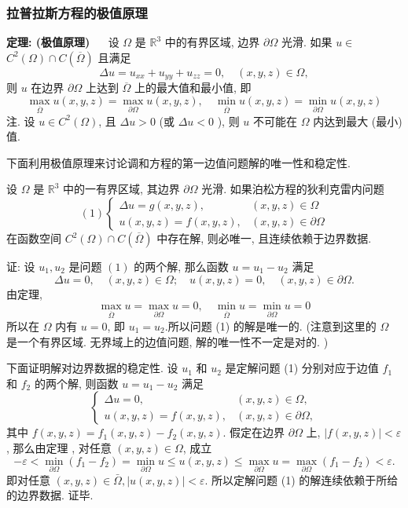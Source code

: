 \subsubsection{拉普拉斯方程的极值原理}
\textbf{定理: (极值原理) }$ \quad $ 设 $ \Omega $ 是 $ \mathbb{R}^{3} $ 中的有界区域, 边界 $ \partial \Omega $ 光滑. 如果 $ u \in $ $ C^{2}(\Omega) \cap C(\overline{\Omega}) $ 且满足
$$
\Delta u=u_{x x}+u_{y y}+u_{z z}=0, \quad(x, y, z) \in \Omega,
$$
则 $ u $ 在边界 $ \partial \Omega $ 上达到 $ \overline{\Omega} $ 上的最大值和最小值, 即
$$
\max _{\overline{\Omega}} u(x, y, z)=\max _{\partial \Omega} u(x, y, z), \quad \min _{\overline{\Omega}} u(x, y, z)=\min _{\partial \Omega} u(x, y, z)
$$
注. 设 $ u \in C^{2}(\Omega) $, 且 $ \Delta u>0 $ (或 $ \Delta u<0 $ ), 则 $ u $ 不可能在 $ \Omega $ 内达到最大 (最小) 值.


下面利用极值原理来讨论调和方程的第一边值问题解的唯一性和稳定性.

 设 $ \Omega $ 是 $ \mathbb{R}^{3} $ 中的一有界区域, 其边界 $ \partial \Omega $ 光滑. 如果泊松方程的狄利克雷内问题
$$
(1)\left\{\begin{array}{ll}
\Delta u=g(x, y, z), & (x, y, z) \in \Omega \\
u(x, y, z)=f(x, y, z), & (x, y, z) \in \partial \Omega
\end{array}\right.
$$
在函数空间 $ C^{2}(\Omega) \cap C(\overline{\Omega}) $ 中存在解, 则必唯一, 且连续依赖于边界数据.

证: 设 $ u_{1}, u_{2} $ 是问题 $ (1) $ 的两个解, 那么函数 $ u=u_{1}-u_{2} $ 满足
$$
\Delta u=0, \quad(x, y, z) \in \Omega ; \quad u(x, y, z)=0, \quad(x, y, z) \in \partial \Omega .
$$
由定理, 
$$
\max _{ \overline{\Omega}} u=\max _{ \partial \Omega} u=0, \quad \min _{ \overline{\Omega}} u=\min _{ \partial \Omega} u=0
$$
所以在 $ \Omega $ 内有 $ u=0 $, 即 $ u_{1}=u_{2} $.所以问题 (1) 的解是唯一的.
(注意到这里的 $ \Omega $ 是一个有界区域. 无界域上的边值问题, 解的唯一性不一定是对的. )

下面证明解对边界数据的稳定性.
设 $ u_{1} $ 和 $ u_{2} $ 是定解问题 (1) 分别对应于边值 $ f_{1} $ 和 $ f_{2} $ 的两个解, 则函数 $ u=u_{1}-u_{2} $ 满足
$$
\left\{\begin{array}{ll}
\Delta u=0, & (x, y, z) \in \Omega, \\
u(x, y, z)=f(x, y, z), & (x, y, z) \in \partial \Omega,
\end{array}\right.
$$
其中 $ f(x, y, z)=f_{1}(x, y, z)-f_{2}(x, y, z) $.
假定在边界 $ \partial \Omega $ 上, $ |f(x, y, z)|<\varepsilon $, 那么由定理 , 对任意 $ (x, y, z) \in \Omega $, 成立
$$
-\varepsilon<\min _{\partial \Omega}\left(f_{1}-f_{2}\right)=\min _{\partial \Omega} u \leqslant u(x, y, z) \leqslant \max _{\partial \Omega} u=\max _{\partial \Omega}\left(f_{1}-f_{2}\right)<\varepsilon .
$$
即对任意 $ (x, y, z) \in \bar{\Omega},|u(x, y, z)|<\varepsilon $. 所以定解问题 (1) 的解连续依赖于所给的边界数据. 证毕.
